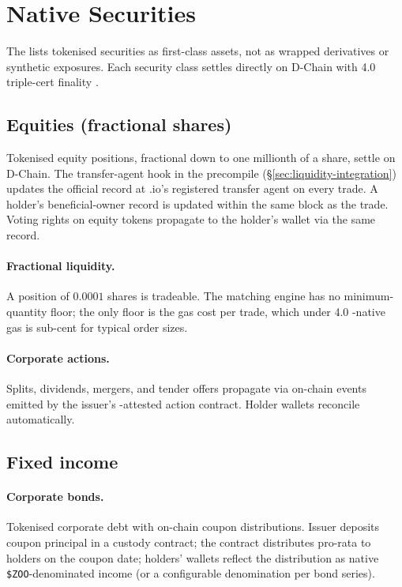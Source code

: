 \section{Native Securities}
\label{sec:native-securities}

The \Zoo{} \DEX{} lists tokenised securities as first-class assets,
not as wrapped derivatives or synthetic exposures. Each security
class settles directly on \Zoo{} D-Chain with \Quasar{} 4.0 triple-cert
finality \cite{lp-020}.

\subsection{Equities (fractional shares)}

Tokenised equity positions, fractional down to one millionth of a
share, settle on \Zoo{} D-Chain. The transfer-agent hook in the
\Liquidity{} precompile (\S\ref{sec:liquidity-integration}) updates
the official record at \Liquidity{}.io's registered transfer agent
on every trade. A holder's beneficial-owner record is updated within
the same block as the trade. Voting rights on equity tokens propagate
to the holder's wallet via the same record.

\paragraph{Fractional liquidity.}
A position of $0.0001$ shares is tradeable. The matching engine has
no minimum-quantity floor; the only floor is the gas cost per trade,
which under \Zoo{} 4.0 \GPU{}-native gas is sub-cent for typical
order sizes.

\paragraph{Corporate actions.}
Splits, dividends, mergers, and tender offers propagate via on-chain
events emitted by the issuer's \Liquidity{}-attested action contract.
Holder wallets reconcile automatically.

\subsection{Fixed income}

\paragraph{Corporate bonds.}
Tokenised corporate debt with on-chain coupon distributions. Issuer
deposits coupon principal in a custody contract; the contract
distributes pro-rata to holders on the coupon date; holders' wallets
reflect the distribution as native \texttt{\$ZOO}-denominated income
(or a configurable denomination per bond series).

